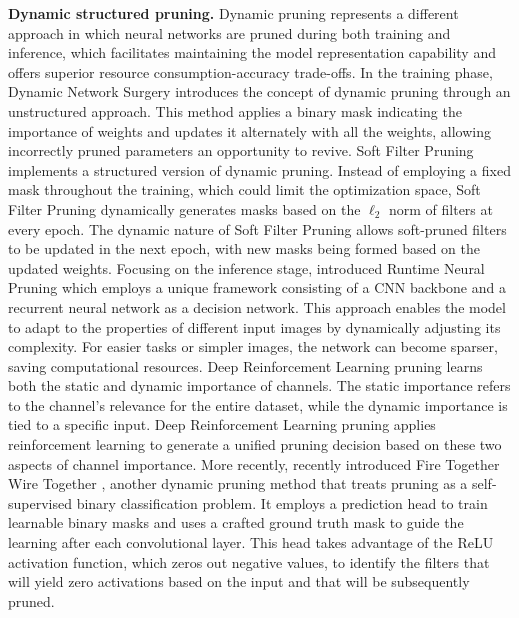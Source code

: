 \noindent\textbf{Dynamic structured pruning.} Dynamic pruning represents a
different approach in which neural networks are pruned during both training and
inference, which facilitates maintaining the model representation capability and
offers superior resource consumption-accuracy trade-offs. In the training phase,
Dynamic Network Surgery \cite{DBLP:conf/nips/GuoYC16} introduces the concept of
dynamic pruning through an unstructured approach. This method applies a binary
mask indicating the importance of weights and updates it alternately with all
the weights, allowing incorrectly pruned parameters an opportunity to revive.
Soft Filter Pruning \cite{DBLP:conf/ijcai/HeKDFY18} implements a structured
version of dynamic pruning. Instead of employing a fixed mask throughout the
training, which could limit the optimization space, Soft Filter Pruning
dynamically generates masks based on the $\ell_2$ norm of filters at every
epoch. The dynamic nature of Soft Filter Pruning allows soft-pruned filters to
be updated in the next epoch, with new masks being formed based on the updated
weights. Focusing on the inference stage, \citeauthor{DBLP:conf/nips/LinRLZ17}
introduced Runtime Neural Pruning \cite{DBLP:conf/nips/LinRLZ17} which employs a
unique framework consisting of a \ac{CNN} backbone and a recurrent neural
network as a decision network. This approach enables the model to adapt to the
properties of different input images by dynamically adjusting its complexity.
For easier tasks or simpler images, the network can become sparser, saving
computational resources. Deep Reinforcement Learning pruning
\cite{DBLP:conf/nips/ChenCP20} learns both the static and dynamic importance of
channels. The static importance refers to the channel's relevance for the entire
dataset, while the dynamic importance is tied to a specific input. Deep
Reinforcement Learning pruning \cite{DBLP:conf/nips/ChenCP20} applies
reinforcement learning to generate a unified pruning decision based on these two
aspects of channel importance. More recently,
\citeauthor{DBLP:conf/cvpr/ElkerdawyE0R22} recently introduced Fire Together
Wire Together \cite{DBLP:conf/cvpr/ElkerdawyE0R22}, another dynamic pruning
method that treats pruning as a self-supervised binary classification problem.
It employs a prediction head to train learnable binary masks and uses a crafted
ground truth mask to guide the learning after each convolutional layer. This
head takes advantage of the \ac{ReLU} activation function, which zeros out
negative values, to identify the filters that will yield zero activations based
on the input and that will be subsequently pruned.\\

